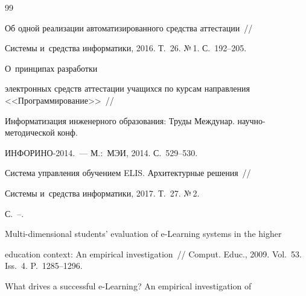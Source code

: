 {\small\frenchspacing


{%




\begin{thebibliography}{99}






Об одной реализации автоматизированного средства аттестации~/\!\!/ 


Системы и~средства информатики, 2016. Т.~26. №\,1. С.~192--205.







 О~принципах разработки 


электронных средств аттестации учащихся по курсам направления <<Программирование>>~/\!\!/ 


Информатизация инженерного образования: Труды Междунар. научно-методической конф. 


ИНФОРИНО-2014.~--- М.:~МЭИ, 2014. С.~529--530.









Система управления обучением ELIS. Архитектурные решения~/\!\!/ 


Системы и~средства информатики, 2017. Т.~27. №\,2. 


С.~\pageref{stgorshenin-a}--\pageref{endgorshenin-a}.









Multi-dimensional students' evaluation of e-Learning systems in the higher 


education context: An empirical investigation~/\!\!/ Comput. Educ., 2009. Vol.~53. Iss.~4. P.~1285--1296.







 What drives a successful e-Learning? An empirical investigation of 



\end{thebibliography}}}
